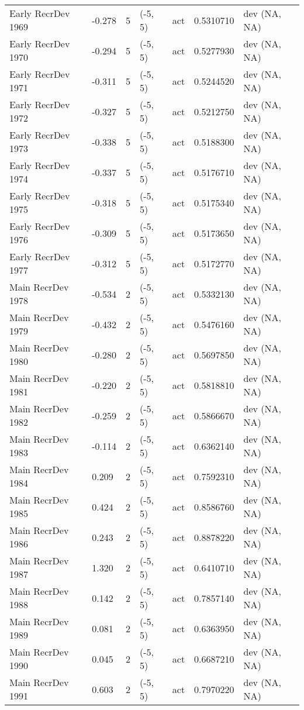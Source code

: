 \documentclass[11pt,
  english,
  letterpaper,
]{article}
\begin{document}
\begin{landscape}
\begin{longtable}[t]{>{\raggedright\arraybackslash}p{6cm}lllll>{\raggedright\arraybackslash}p{4cm}}
Early RecrDev 1969 & -0.278 & 5 & (-5, 5) & act & 0.5310710 & dev (NA, NA)\\
Early RecrDev 1970 & -0.294 & 5 & (-5, 5) & act & 0.5277930 & dev (NA, NA)\\
Early RecrDev 1971 & -0.311 & 5 & (-5, 5) & act & 0.5244520 & dev (NA, NA)\\
Early RecrDev 1972 & -0.327 & 5 & (-5, 5) & act & 0.5212750 & dev (NA, NA)\\
Early RecrDev 1973 & -0.338 & 5 & (-5, 5) & act & 0.5188300 & dev (NA, NA)\\
Early RecrDev 1974 & -0.337 & 5 & (-5, 5) & act & 0.5176710 & dev (NA, NA)\\
Early RecrDev 1975 & -0.318 & 5 & (-5, 5) & act & 0.5175340 & dev (NA, NA)\\
Early RecrDev 1976 & -0.309 & 5 & (-5, 5) & act & 0.5173650 & dev (NA, NA)\\
Early RecrDev 1977 & -0.312 & 5 & (-5, 5) & act & 0.5172770 & dev (NA, NA)\\
Main RecrDev 1978 & -0.534 & 2 & (-5, 5) & act & 0.5332130 & dev (NA, NA)\\
Main RecrDev 1979 & -0.432 & 2 & (-5, 5) & act & 0.5476160 & dev (NA, NA)\\
Main RecrDev 1980 & -0.280 & 2 & (-5, 5) & act & 0.5697850 & dev (NA, NA)\\
Main RecrDev 1981 & -0.220 & 2 & (-5, 5) & act & 0.5818810 & dev (NA, NA)\\
Main RecrDev 1982 & -0.259 & 2 & (-5, 5) & act & 0.5866670 & dev (NA, NA)\\
Main RecrDev 1983 & -0.114 & 2 & (-5, 5) & act & 0.6362140 & dev (NA, NA)\\
Main RecrDev 1984 & 0.209 & 2 & (-5, 5) & act & 0.7592310 & dev (NA, NA)\\
Main RecrDev 1985 & 0.424 & 2 & (-5, 5) & act & 0.8586760 & dev (NA, NA)\\
Main RecrDev 1986 & 0.243 & 2 & (-5, 5) & act & 0.8878220 & dev (NA, NA)\\
Main RecrDev 1987 & 1.320 & 2 & (-5, 5) & act & 0.6410710 & dev (NA, NA)\\
Main RecrDev 1988 & 0.142 & 2 & (-5, 5) & act & 0.7857140 & dev (NA, NA)\\
Main RecrDev 1989 & 0.081 & 2 & (-5, 5) & act & 0.6363950 & dev (NA, NA)\\
Main RecrDev 1990 & 0.045 & 2 & (-5, 5) & act & 0.6687210 & dev (NA, NA)\\
Main RecrDev 1991 & 0.603 & 2 & (-5, 5) & act & 0.7970220 & dev (NA, NA)\\

\end{longtable}
\end{landscape}
\end{document}
